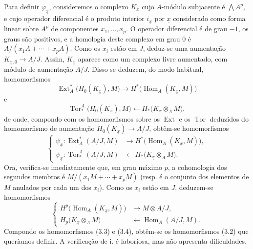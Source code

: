 \documentclass[11pt,twoside,openany]{book}
\numberwithin{equation}{section}
\theoremstyle{plain}
\theoremstyle{definition}
\theoremstyle{remark}
\begin{document}
Para definir $\varphi_{\underline{x}}$, consideremos o complexo
$K_{\underline{x}}$ cujo $A$-módulo subjacente é $\bigwedge A^{p}$, e
cujo operador diferencial é o produto interior $i_{\underline{x}}$ por
$\underline{x}$ considerado como forma linear sobre $A^{p}$ de componentes
$x_1,\ldots,x_p$. O operador diferencial é de grau $-1$, os graus são
positivos, e a homologia deste complexo em grau $0$ é
$A/(x_1A+\cdots+x_pA)$. Como os $x_i$ estão em $J$, deduz-se uma
aumentação $K_{\underline{x},0}\longrightarrow A/J$. Assim,
$K_{\underline{x}}$ aparece como um complexo livre aumentado, com módulo
de aumentação $A/J$. Disso se deduzem, do modo habitual, homomorfismos
\[
\operatorname{Ext}_{A}^{*}\bigl(H_0(K_{\underline{x}}),M\bigr)
\longrightarrow
H^{*}\bigl(\operatorname{Hom}_{A}(K_{\underline{x}},M)\bigr)
\]
e
\[
\operatorname{Tor}_{*}^{A}\bigl(H_0(K_{\underline{x}}),M\bigr)
\longleftarrow
H_{*}\bigl(K_{\underline{x}}\otimes_A M\bigr),
\]
de onde, compondo com os homomorfismos sobre os $\operatorname{Ext}$ e os
$\operatorname{Tor}$ deduzidos do homomorfismo de aumentação
$H_0(K_{\underline{x}})\longrightarrow A/J$, obtêm-se homomorfismos
\begin{equation}\tag{3.3}
\left\{
\begin{aligned}
\psi_{\underline{x}}:
\operatorname{Ext}_{A}^{*}(A/J,M)
&\longrightarrow H^{*}\bigl(\operatorname{Hom}_{A}(K_{\underline{x}},M)\bigr),\\
\psi_{\underline{x}}:
\operatorname{Tor}_{*}^{A}(A/J,M)
&\longleftarrow H_{*}\bigl(K_{\underline{x}}\otimes_A M\bigr).
\end{aligned}
\right.
\end{equation}
Ora, verifica-se imediatamente que, em grau máximo $p$, a cohomologia dos segundos
membros é $M/(x_1M+\cdots+x_pM)$ (resp. é o conjunto dos elementos de $M$
anulados por cada um dos $x_i$). Como os $x_i$ estão em $J$, deduzem-se
homomorfismos
\begin{equation}\tag{3.4}
\left\{
\begin{aligned}
H^{p}\bigl(\operatorname{Hom}_{A}(K_{\underline{x}},M)\bigr)
&\longrightarrow M\otimes A/J,\\
H_{p}\bigl(K_{\underline{x}}\otimes_A M\bigr)
&\longleftarrow\operatorname{Hom}_{A}(A/J,M).
\end{aligned}
\right.
\end{equation}
Compondo os homomorfismos (3.3) e (3.4), obtêm-se os homomorfismos (3.2)
que queríamos definir. A verificação de i. é laboriosa, mas não
apresenta dificuldades.
\end{document}
